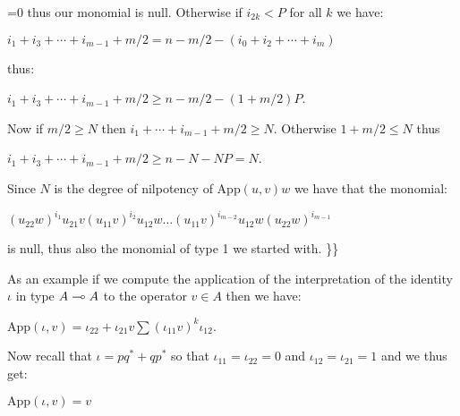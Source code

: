 =0 thus our monomial is null. Otherwise if \(i_{2k}<P\) for all \(k\) we
have:

\begin{description}
\tightlist
\item[]
\(i_1+i_3+\cdots +i_{m-1} + m/2 = n - m/2 - (i_0+i_2+\cdots +i_m)\)
\end{description}

thus:

\begin{description}
\tightlist
\item[]
\(i_1+i_3+\cdots +i_{m-1} + m/2\geq n - m/2 - (1+m/2)P\).
\end{description}

Now if \(m/2\geq N\) then \(i_1+\cdots+i_{m-1}+m/2 \geq N\). Otherwise
\(1+m/2\leq N\) thus

\begin{description}
\tightlist
\item[]
\(i_1+i_3+\cdots +i_{m-1} + m/2\geq n - N - NP = N\).
\end{description}

Since \(N\) is the degree of nilpotency of \(\mathrm{App}(u,v)w\) we
have that the monomial:

\begin{description}
\tightlist
\item[]
\((u_{22}w)^{i_1}u_{21}v(u_{11}v)^{i_2}u_{12}w\dots(u_{11}v)^{i_{m-2}}u_{12}w(u_{22}w)^{i_{m-1}}\)
\end{description}

is null, thus also the monomial of type 1 we started with. \}\}

As an example if we compute the application of the interpretation of the
identity \(\iota\) in type \(A\multimap A\) to the operator \(v\in A\) then
we have:

\begin{description}
\tightlist
\item[]
\(\mathrm{App}(\iota, v) = \iota_{22} + \iota_{21}v\sum(\iota_{11}v)^k\iota_{12}\).
\end{description}

Now recall that \(\iota = pq^* + qp^*\) so that
\(\iota_{11} = \iota_{22} = 0\) and \(\iota_{12} = \iota_{21} = 1\) and
we thus get:

\begin{description}
\tightlist
\item[]
\(\mathrm{App}(\iota, v) = v\)
\end{description}

